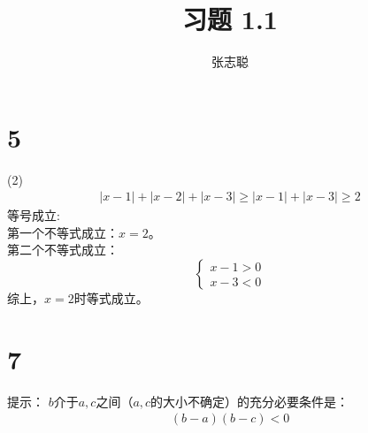 \documentclass{article}
\begin{document}
\title{习题 1.1}
\author{张志聪}
\maketitle

\section*{5}

 (2)
\begin{align*}
  |x - 1| + |x - 2| + |x - 3| \geq |x - 1| + |x - 3| \geq 2
\end{align*}
等号成立:\\
第一个不等式成立：$x = 2$。\\
第二个不等式成立：
\begin{equation*}
  \begin{cases*}
    x - 1 > 0 \\
    x - 3 < 0
  \end{cases*}
\end{equation*}
综上，$x = 2$时等式成立。

\section*{7}

提示：
$b$介于$a, c$之间（$a,c$的大小不确定）的充分必要条件是：
\begin{align*}
  (b - a) (b - c) < 0
\end{align*}
\end{document}
